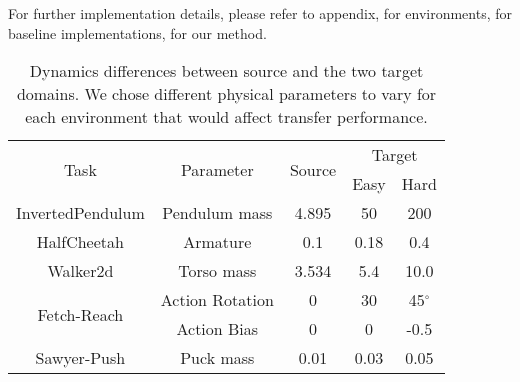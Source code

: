For further implementation details, please refer to appendix,  for environments,  for baseline implementations,  for our method. 



\begin{table}[t]
\centering
\begin{tabular}{ ccccc } 
 \toprule
 \multirow{2}{7.5em}{\centering Task} & \multirow{2}{6.5em}{\centering Parameter} & \multirow{2}{3em}{\centering Source} & \multicolumn{2}{c}{Target} \\ 
 & & & Easy & Hard \\
 \midrule
 InvertedPendulum & Pendulum mass & 4.895 & 50 & 200 \\ 
 \midrule
 HalfCheetah & Armature & 0.1 & 0.18 & 0.4 \\ 
 \midrule
 Walker2d & Torso mass & 3.534 & 5.4 & 10.0 \\ 
 \midrule
 \multirow{2}{7.5em}{\centering Fetch-Reach} & Action Rotation & 0 & 30 & 45$^{\circ}$\\
 & Action Bias & 0 & 0 & -0.5 \\
 \midrule
 Sawyer-Push & Puck mass & 0.01 & 0.03 & 0.05 \\
 \bottomrule
\end{tabular}
\vspace{1em}
\caption{Dynamics differences between source and the two target domains.  We chose different physical parameters to vary for each environment that would affect transfer performance.}
\label{tab:dynamics-diff}
\end{table}


